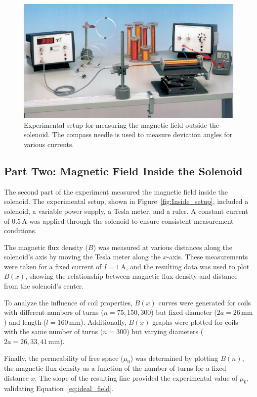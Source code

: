 \documentclass[journal]{IEEEtran}
\begin{document}
\begin{figure}[H]
    \centering
    \includegraphics[width=\linewidth]{IMAGES/Biot-Savart_experimen_setup.png}
    \caption{Experimental setup for measuring the magnetic field outside the solenoid. The compass needle is used to measure deviation angles for various currents.}
    \label{fig:Outside_setup}
\end{figure}

\subsection{Part Two: Magnetic Field Inside the Solenoid}
The second part of the experiment measured the magnetic field inside the solenoid. The experimental setup, shown in Figure~\ref{fig:Inside_setup}, included a solenoid, a variable power supply, a Tesla meter, and a ruler. A constant current of \( 0.5 \, \text{A} \) was applied through the solenoid to ensure consistent measurement conditions.

The magnetic flux density (\( B \)) was measured at various distances along the solenoid's axis by moving the Tesla meter along the \( x \)-axis. These measurements were taken for a fixed current of \( I = 1 \, \text{A} \), and the resulting data was used to plot \( B(x) \), showing the relationship between magnetic flux density and distance from the solenoid's center.

To analyze the influence of coil properties, \( B(x) \) curves were generated for coils with different numbers of turns (\( n = 75, 150, 300 \)) but fixed diameter (\( 2a = 26 \, \text{mm} \)) and length (\( l = 160 \, \text{mm} \)). Additionally, \( B(x) \) graphs were plotted for coils with the same number of turns (\( n = 300 \)) but varying diameters (\( 2a = 26, 33, 41 \, \text{mm} \)).

Finally, the permeability of free space (\( \mu_0 \)) was determined by plotting \( B(n) \), the magnetic flux density as a function of the number of turns for a fixed distance \( x \). The slope of the resulting line provided the experimental value of \( \mu_0 \), validating Equation~\eqref{eq:ideal_field}.
\end{document}
